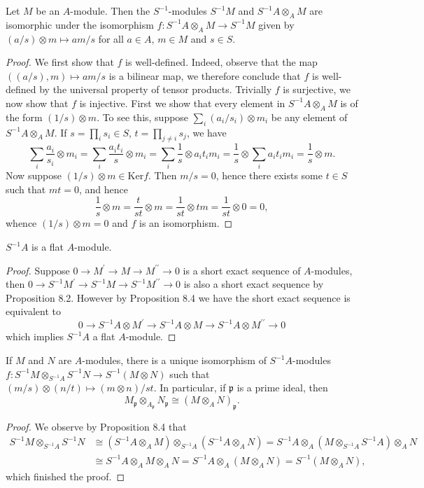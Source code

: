 \begin{proposition}
Let $M$ be an $A$-module. Then the $S^{-1}$-modules $S^{-1}M$ and $S^{-1}A\otimes_AM$ are isomorphic under the isomorphism $f:S^{-1}A\otimes_AM\to S^{-1}M$ given by $(a/s)\otimes m\mapsto am/s$ for all $a\in A$, $m\in M$ and $s\in S$.
\end{proposition}
\begin{proof}
We first show that $f$ is well-defined. Indeed, observe that the map $((a/s),m)\mapsto am/s$ is a bilinear map, we therefore conclude that $f$ is well-defined by the universal property of tensor products. Trivially $f$ is surjective, we now show that $f$ is injective. First we show that every element in $S^{-1}A\otimes_AM$ is of the form $(1/s)\otimes m$. To see this, suppose $\sum_i(a_i/s_i)\otimes m_i$ be any element of $S^{-1}A\otimes_AM$. If $s=\prod_is_i\in S$, $t=\prod_{j\ne i}s_j$, we have 
$$
\sum_i{\frac{a_i}{s_i}\otimes m_i}=\sum_i{\frac{a_it_i}{s}\otimes m_i}=\sum_i{\frac{1}{s}\otimes a_it_im_i}=\frac{1}{s}\otimes \sum_i{a_it_im_i}=\frac{1}{s}\otimes m.
$$
Now suppose $(1/s)\otimes m\in\mathrm{Ker}f$. Then $m/s=0$, hence there exists some $t\in S$ such that $mt=0$, and hence 
$$
\frac{1}{s}\otimes m=\frac{t}{st}\otimes m=\frac{1}{st}\otimes tm=\frac{1}{st}\otimes 0=0,
$$
whence $(1/s)\otimes m=0$ and $f$ is an isomorphism.
\end{proof}
\begin{corollary}
$S^{-1}A$ is a flat $A$-module.
\end{corollary}
\begin{proof}
Suppose $0\longrightarrow M^{\prime}\longrightarrow M\longrightarrow M^{\prime\prime}\longrightarrow 0$ is a short exact sequence of $A$-modules, then $0\longrightarrow S^{-1}M^{\prime}\longrightarrow S^{-1}M\longrightarrow S^{-1}M^{\prime\prime}\longrightarrow 0$ is also a short exact sequence by Proposition 8.2. However by Proposition 8.4 we have the short exact sequence is equivalent to 
$$
0\longrightarrow S^{-1}A\otimes M^{\prime}\longrightarrow S^{-1}A\otimes M\longrightarrow S^{-1}A\otimes M^{\prime\prime}\longrightarrow 0
$$
which implies $S^{-1}A$ a flat $A$-module.
\end{proof}
\begin{proposition}
If $M$ and $N$ are $A$-modules, there is a unique isomorphism of $S^{-1}A$-modules $f:S^{-1}M\otimes_{S^{-1}A}S^{-1}N\to S^{-1}(M\otimes N)$ such that $(m/s)\otimes(n/t)\mapsto(m\otimes n)/st$. In particular, if $\mathfrak{p}$ is a prime ideal, then 
$$
M_{\mathfrak{p}}\otimes _{A_{\mathfrak{p}}}N_{\mathfrak{p}}\cong \left( M\otimes _AN \right) _{\mathfrak{p}}.
$$
\end{proposition}
\begin{proof}
We observe by Proposition 8.4 that 
$$
\begin{aligned}
S^{-1}M\otimes _{S^{-1}A}S^{-1}N&\cong \left( S^{-1}A\otimes _AM \right) \otimes _{S^{-1}A}\left( S^{-1}A\otimes _AN \right) =S^{-1}A\otimes _A\left( M\otimes _{S^{-1}A}S^{-1}A \right) \otimes _AN
\\
&\cong S^{-1}A\otimes _AM\otimes _AN=S^{-1}A\otimes _A\left( M\otimes _AN \right) =S^{-1}\left( M\otimes _AN \right) ,
\end{aligned}
$$
which finished the proof.
\end{proof}